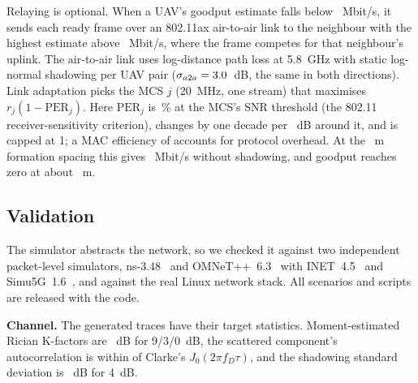 \documentclass[journal,twocolumn,10pt]{IEEEtran}
\begin{document}
Relaying is optional. When a UAV's goodput estimate falls below \RelayThresholdMbps~Mbit/s, it sends each ready frame over an 802.11ax air-to-air link to the neighbour with the highest estimate above \RelayNeighbourMinMbps~Mbit/s, where the frame competes for that neighbour's uplink. The air-to-air link uses log-distance path loss at 5.8~GHz with static log-normal shadowing per UAV pair ($\sigma_{a2a}=3.0$~dB, the same in both directions). Link adaptation picks the MCS $j$ (20~MHz, one stream) that maximises $r_j(1-\mathrm{PER}_j)$. Here $\mathrm{PER}_j$ is \AtwoAPerThreshold\,\% at the MCS's SNR threshold (the 802.11 receiver-sensitivity criterion), changes by one decade per \AtwoAPerSlope~dB around it, and is capped at 1; a MAC efficiency of \AtwoAMacEff{} accounts for protocol overhead. At the \AtwoASpacingM~m formation spacing this gives \AtwoASpacingMbps~Mbit/s without shadowing, and goodput reaches zero at about \AtwoARangeM~m.

\subsection{Validation}\label{sec:validation}
The simulator abstracts the network, so we checked it against two independent packet-level simulators, ns-3.48~\cite{riley2010ns3} and OMNeT++~6.3~\cite{varga2008omnetpp} with INET~4.5~\cite{meszaros2019inet} and Simu5G~1.6~\cite{nardini2020simu5g}, and against the real Linux network stack. All scenarios and scripts are released with the code.

\textbf{Channel.} The generated traces have their target statistics. Moment-estimated Rician K-factors are \ValChanKHat~dB for 9/3/0~dB, the scattered component's autocorrelation is within \ValChanClarkeErr{} of Clarke's $J_0(2\pi f_D\tau)$, and the shadowing standard deviation is \ValChanShadowStd~dB for 4~dB.
\end{document}
